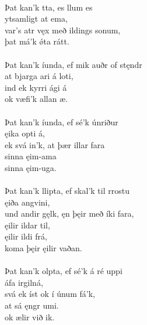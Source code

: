  \\

\bva Þat kan'k tta, \hld es llum es \\%
\ind {}ytsamligt at ema, \\%
var's atr vęx \hld með ildings sonum, \\%
\ind þat má'k ǿta rátt.\\%

 \\

\bva Þat kan'k íunda, \hld ef mik auðr of stęndr \\%
\ind at bjarga ari á loti, \\%
ind ek kyrri \hld {}ági á \\%
\ind ok væfi'k allan æ.\\%

 \\

\bva Þat kan'k íunda, \hld ef sé'k únriður \\%
\ind {}ęika opti á, \\%
ek svá in'k, \hld at þær illar fara \\%
\ind sinna ęim-ama \\%
\ind sinna ęim-uga.\\%

 \\

\bva Þat kan'k llipta, \hld ef skal'k til rrostu \\%
\ind {}ęiða angvini, \\%
und andir gęlk, \hld ęn þęir með íki fara, \\%
\ind {}ęilir ildar til, \\%
\ind {}ęilir ildi frá, \\%
\ind koma þęir ęilir vaðan.\\%

 \\

\bva Þat kan'k olpta, \hld ef sé'k á ré uppi \\%
\ind {}áfa irgilná, \\%
svá ek íst \hld ok í únum fá'k, \\%
\ind at sá ęngr umi. \\%
\ind ok ælir við ik.\\%


